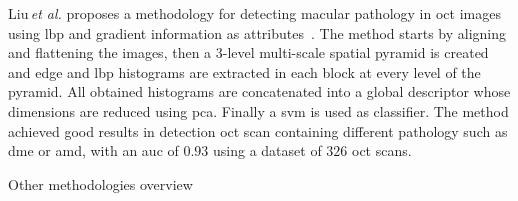 Liu\,\textit{et al.} proposes a methodology for detecting macular pathology in \ac{oct} images using \ac{lbp} and gradient information as attributes~\cite{Liu2011}.
The method starts by aligning and flattening the images, then a $3$-level multi-scale spatial pyramid is created and edge and \ac{lbp} histograms are extracted in each block at every level of the pyramid. 
All obtained histograms are concatenated into a global descriptor whose dimensions are reduced using \ac{pca}. Finally a \ac{svm} is used as classifier. 
The method achieved good results in detection \ac{oct} scan containing different pathology such as \ac{dme} or \ac{amd}, with an \ac{auc} of $0.93$ using a dataset of $326$ \ac{oct} scans.  





%   


\begin{table}
  \caption{Other methodologies overview}
  \centering
  
  \label{tab:survey}
\end{table}



